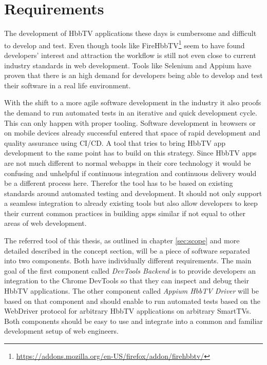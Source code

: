 \chapter{Requirements\label{cha:chapter3}}

The development of HbbTV applications these days is cumbersome and difficult to develop and test. Even though tools like FireHbbTV\footnote{\url{https://addons.mozilla.org/en-US/firefox/addon/firehbbtv/}} seem to have found developers' interest and attraction the workflow is still not even close to current industry standards in web development. Tools like Selenium and Appium have proven that there is an high demand for developers being able to develop and test their software in a real life environment.

With the shift to a more agile software development in the industry it also proofs the demand to run automated tests in an iterative and quick development cycle. This can only happen with proper tooling. Software development in browsers or on mobile devices already successful entered that space of rapid development and quality assurance using CI/CD. A tool that tries to bring HbbTV app development to the same point has to build on this strategy. Since HbbTV apps are not much different to normal webapps in their core technology it would be confusing and unhelpful if continuous integration and continuous delivery would be a different process here. Therefor the tool has to be based on existing standards around automated testing and development. It should not only support a seamless integration to already existing tools but also allow developers to keep their current common practices in building apps similar if not equal to other areas of web development.

The referred tool of this thesis, as outlined in chapter \ref{sec:scope} and more detailed described in the concept section, will be a piece of software separated into two components. Both have individually different requirements. The main goal of the first component called \textit{DevTools Backend} is to provide developers an integration to the Chrome DevTools so that they can inspect and debug their HbbTV applications. The other component called \textit{Appium HbbTV Driver} will be based on that component and should enable to run automated tests based on the WebDriver protocol for arbitrary HbbTV applications on arbitrary SmartTVs. Both components should be easy to use and integrate into a common and familiar development setup of web engineers.

